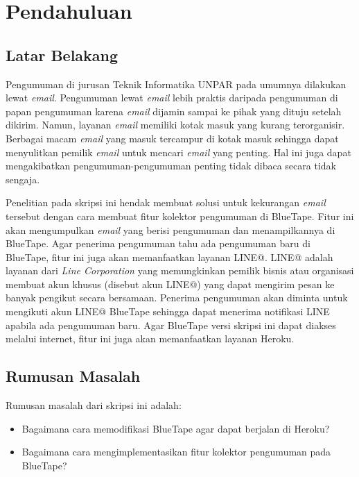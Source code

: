 \chapter{Pendahuluan}
\label{chap:pendahuluan}
   
\section{Latar Belakang}
\label{sec:latarBelakang}
Pengumuman di jurusan Teknik Informatika UNPAR pada umumnya dilakukan lewat \textit{email}. Pengumuman lewat \textit{email} lebih praktis daripada pengumuman di papan pengumuman karena \textit{email} dijamin sampai ke pihak yang dituju setelah dikirim. Namun, layanan \textit{email} memiliki kotak masuk yang kurang terorganisir. Berbagai macam \textit{email} yang masuk tercampur di kotak masuk sehingga dapat menyulitkan pemilik \textit{email} untuk mencari \textit{email} yang penting. Hal ini juga dapat mengakibatkan pengumuman-pengumuman penting tidak dibaca secara tidak sengaja.

Penelitian pada skripsi ini hendak membuat solusi untuk kekurangan \textit{email} tersebut dengan cara membuat fitur kolektor pengumuman di BlueTape. Fitur ini akan mengumpulkan \textit{email} yang berisi pengumuman dan menampilkannya di BlueTape. Agar penerima pengumuman tahu ada pengumuman baru di BlueTape, fitur ini juga akan memanfaatkan layanan LINE@. LINE@ adalah layanan dari \textit{Line Corporation} yang memungkinkan pemilik bisnis atau organisasi membuat akun khusus (disebut akun LINE@) yang dapat mengirim pesan ke banyak pengikut secara bersamaan. Penerima pengumuman akan diminta untuk mengikuti akun LINE@ BlueTape sehingga dapat menerima notifikasi LINE apabila ada pengumuman baru. Agar BlueTape versi skripsi ini dapat diakses melalui internet, fitur ini juga akan memanfaatkan layanan Heroku.

\section{Rumusan Masalah}
\label{sec:rumusanmasalah}
Rumusan masalah dari skripsi ini adalah: 
\begin{itemize}
	\item Bagaimana cara memodifikasi BlueTape agar dapat berjalan di Heroku?
	\item Bagaimana cara mengimplementasikan fitur kolektor pengumuman pada BlueTape?
\end{itemize}

